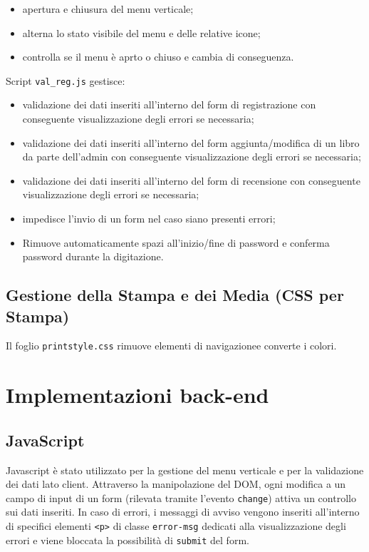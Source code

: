 \documentclass{article}
\begin{document}
\begin{itemize}
    \item apertura e chiusura del menu verticale;
    \item alterna lo stato visibile del menu e delle relative icone;
    \item controlla se il menu è aprto o chiuso e cambia di conseguenza.
\end{itemize}

Script \texttt{val\_reg.js} gestisce:

\begin{itemize}
    \item validazione dei dati inseriti all'interno del form di registrazione con conseguente visualizzazione degli errori se necessaria;
    \item validazione dei dati inseriti all'interno del form aggiunta/modifica di un libro da parte dell'admin con conseguente visualizzazione degli errori se necessaria;
    \item validazione dei dati inseriti all'interno del form di recensione con conseguente visualizzazione degli errori se necessaria;
    \item impedisce l'invio di un form nel caso siano presenti errori;
    \item Rimuove automaticamente spazi all'inizio/fine di password e conferma password durante la digitazione.
\end{itemize}



\subsection{Gestione della Stampa e dei Media (CSS per Stampa)}
Il foglio \texttt{printstyle.css} rimuove elementi di navigazionee converte i colori.

\newpage


\section{Implementazioni back-end}



\subsection{JavaScript}

Javascript è stato utilizzato per la gestione del menu verticale e per la validazione dei dati lato client.
Attraverso la manipolazione del DOM, ogni modifica a un campo di input di un form (rilevata tramite l'evento \texttt{change}) attiva un controllo sui dati inseriti.
In caso di errori, i messaggi di avviso vengono inseriti all'interno di specifici elementi \texttt{<p>} di classe \texttt{error-msg} dedicati alla visualizzazione degli errori e viene bloccata la possibilità di \texttt{submit} del form.
\end{document}
